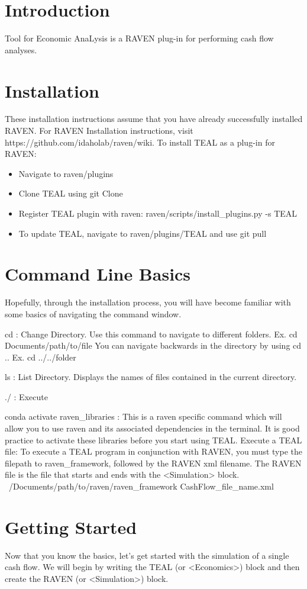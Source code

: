 \section{Introduction}
Tool for Economic AnaLysis is a RAVEN plug-in for performing cash flow analyses. 

\section{Installation}
These installation instructions assume that you have already successfully installed RAVEN. For RAVEN Installation instructions, visit https://github.com/idaholab/raven/wiki.
To install TEAL as a plug-in for RAVEN:
\begin{itemize}
    \item Navigate to raven/plugins
    \item Clone TEAL using git Clone
    \item Register TEAL plugin with raven: raven/scripts/install\_plugins.py -s TEAL
    \item To update TEAL, navigate to raven/plugins/TEAL and use git pull
\end{itemize}

\section{Command Line Basics}
Hopefully, through the installation process, you will have become familiar with some basics of navigating the command window. 

cd : Change Directory.
    Use this command to navigate to different folders. Ex. cd Documents/path/to/file
    You can navigate backwards in the directory by using cd .. Ex. cd ../../folder

ls : List Directory.
    Displays the names of files contained in the current directory. 

./ : Execute

conda activate raven\_libraries : This is a raven specific command which will allow you to use raven and its associated dependencies in the terminal.
It is good practice to activate these libraries before you start using TEAL. 
Execute a TEAL file:
To execute a TEAL program in conjunction with RAVEN, you must type the filepath to raven\_framework, followed by the RAVEN xml filename. The RAVEN file is the file that starts and ends with the <Simulation> block.
    ~/Documents/path/to/raven/raven\_framework CashFlow\_file\_name.xml 

\section{Getting Started}
Now that you know the basics, let's get started with the simulation of a single cash flow. We will begin by writing the TEAL (or <Economics>) block and then create the RAVEN (or <Simulation>) block.

